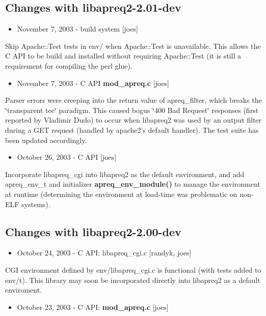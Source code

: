 \subsection{Changes with libapreq2-2.01-dev}\label{v2_01_dev}
\begin{itemize}
\item November 7, 2003 - build system [joes]\end{itemize}


Skip Apache::Test tests in env/ when Apache::Test is unavailable. This allows the C API to be build and installed without requiring Apache::Test (it is still a requirement for compiling the perl glue).

\begin{itemize}
\item November 7, 2003 - C API {\bf mod\_\-apreq.c} [joes]\end{itemize}


Parser errors were creeping into the return value of apreq\_\-filter, which breaks the \char`\"{}transparent tee\char`\"{} paradigm. This caused bogus \char`\"{}400 Bad Request\char`\"{} responses (first reported by Vladimir Dudo) to occur when libapreq2 was used by an output filter during a GET request (handled by apache2's default handler). The test suite has been updated accordingly.

\begin{itemize}
\item October 26, 2003 - C API [joes]\end{itemize}


Incorporate libapreq\_\-cgi into libapreq2 as the default environment, and add apreq\_\-env\_\-t and initializer {\bf apreq\_\-env\_\-module()} to manage the environment at runtime (determining the environment at load-time was problematic on non-ELF systems).\subsection{Changes with libapreq2-2.00-dev}\label{v2_0_0}
\begin{itemize}
\item October 24, 2003 - C API: libapreq\_\-cgi.c [randyk, joes]\end{itemize}


CGI environment defined by env/libapreq\_\-cgi.c is functional (with tests added to env/t). This library may soon be incorporated directly into libapreq2 as a default enviroment.

\begin{itemize}
\item October 23, 2003 - C API: {\bf mod\_\-apreq.c} [joes]\end{itemize}


